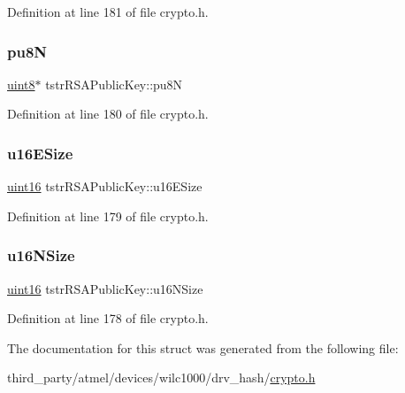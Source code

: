 Definition at line 181 of file crypto.\+h.

\mbox{\label{structtstrRSAPublicKey_a407c76a01894f8d3bfe260a11978fac8}} 
\subsubsection{\texorpdfstring{pu8N}{pu8N}}
{\footnotesize\ttfamily \hyperlink{group__DataT_ga4df709a77647e870bbf1d955b8edc9a6}{uint8}$\ast$ tstr\+R\+S\+A\+Public\+Key\+::pu8N}



Definition at line 180 of file crypto.\+h.

\mbox{\label{structtstrRSAPublicKey_ad9101c76a4440b6a387a7a70b6efe86c}} 
\subsubsection{\texorpdfstring{u16\+E\+Size}{u16ESize}}
{\footnotesize\ttfamily \hyperlink{group__DataT_ga1daa745171fc6e31d942c161422a76f9}{uint16} tstr\+R\+S\+A\+Public\+Key\+::u16\+E\+Size}



Definition at line 179 of file crypto.\+h.

\mbox{\label{structtstrRSAPublicKey_a388e03d722ab1e65a51c05e418883df5}} 
\subsubsection{\texorpdfstring{u16\+N\+Size}{u16NSize}}
{\footnotesize\ttfamily \hyperlink{group__DataT_ga1daa745171fc6e31d942c161422a76f9}{uint16} tstr\+R\+S\+A\+Public\+Key\+::u16\+N\+Size}



Definition at line 178 of file crypto.\+h.



The documentation for this struct was generated from the following file\+:\begin{DoxyCompactItemize}
\item 
third\+\_\+party/atmel/devices/wilc1000/drv\+\_\+hash/\hyperlink{third__party_2atmel_2devices_2wilc1000_2drv__hash_2crypto_8h}{crypto.\+h}\end{DoxyCompactItemize}
